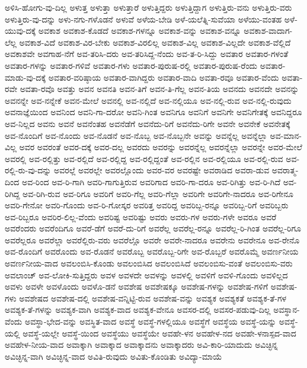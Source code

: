 {ಅಳಿಸಿ-ಹೋಗು-ವು-ದಿಲ್ಲ
ಅಳುತ್ತ
ಅಳುತ್ತಾ
ಅಳುತ್ತಾರೆ
ಅಳುತ್ತಿದ್ದರು
ಅಳುತ್ತಿದ್ದಾಗ
ಅಳುತ್ತಿರು-ವನು
ಅಳುತ್ತಿರು-ವರು
ಅಳುತ್ತಿರು-ವು-ದನ್ನು
ಅಳು-ನಗು-ಗಳೊಡನೆ
ಅಳುವೆ
ಅಳೆಯ-ಬೇಡಿ
ಅಳೆ-ಯಲೆತ್ನಿ-ಸುವೆಯಾ
ಅಳೆಯು-ವಂತಹ
ಅಳೆ-ಯುವು-ದಕ್ಕೆ
ಅವಕಾಶ
ಅವಕಾಶ-ಕೊಡದೆ
ಅವಕಾಶ-ಗಳನ್ನೂ
ಅವಕಾಶ-ವನ್ನು
ಅವಕಾಶ-ವನ್ನೂ
ಅವಕಾಶ-ವಾದಾಗ-ಲೆಲ್ಲ
ಅವಕಾಶ-ವಿದೆ
ಅವಕಾಶ-ವಿರ-ಬೇಕು
ಅವಕಾಶ-ವಿರಲಿಲ್ಲ
ಅವಕಾಶ-ವಿಲ್ಲ
ಅವಕಾಶ-ವಿಲ್ಲದೇ
ಅವಕಾಶ-ವೆಲ್ಲಿದೆ
ಅವಕಾಶವೇ
ಅವಗಾಹ-ನೆಗೆ
ಅವ-ತರಿಸಿ-ದರು
ಅವ-ತರಿಸಿದ್ದ-ನೆಂದು
ಅವ-ತ-ರಿ-ಸಿದ್ದು
ಅವತಾರ
ಅವತಾರ-ಗಳಂತೆ
ಅವತಾರ-ಗಳನ್ನು
ಅವತಾರ-ಗಳಿವೆ
ಅವತಾರ-ಗಳು
ಅವತಾರ-ಪುರುಷ-ರಲ್ಲಿ
ಅವತಾರ-ಪುರುಷ-ರೆಂದು
ಅವತಾರ-ಮಾಡು-ವು-ದಕ್ಕೆ
ಅವತಾರ-ವರಿಷ್ಠಾಯ
ಅವತಾರ-ವಾಗಿದ್ದರು
ಅವತಾರ-ವಾದಿ
ಅವತಾ-ರವೂ
ಅವತಾರ-ವೆಂದು
ಅವತಾ-ರವೇ
ಅವತಾ-ರವೊ
ಅವತ್ತು
ಅವನ
ಅವನತಿ
ಅವನ-ತಿಗೆ
ಅವನ-ತಿ-ಗೆಲ್ಲ
ಅವನ-ತಿಯ
ಅವನದು
ಅವನದೇ
ಅವನನ್ನು
ಅವನನ್ನೇ
ಅವ-ನನ್ನೇಕೆ
ಅವನ-ಮೇಲೆ
ಅವನಲ್ಲಿ
ಅವ-ನಲ್ಲಿದೆ
ಅವ-ನಲ್ಲಿಯೂ
ಅವ-ನಲ್ಲಿ-ರುವ
ಅವ-ನಲ್ಲಿ-ರುವುದು
ಅವನಾಜ್ಞೆಯಿಂದ
ಅವನಿಂದ
ಅವನಿ-ಗಾ-ದರೋ
ಅವನಿ-ಗಿಂತ
ಅವನಿಗೂ
ಅವನಿಗೆ
ಅವನಿಗೇ
ಅವನಿಗೇತಕ್ಕೆ
ಅವನಿದ್ದರೂ
ಅವ-ನಿಲ್ಲದ
ಅವನು
ಅವನೆ
ಅವನೆಂತಹ
ಅವನೆಡೆಗೆ
ಅವನೆದು-ರಿಗೆ
ಅವನೆದು-ರಿಗೇ
ಅವನೇ
ಅವನೇಕೆ
ಅವನೇತಕ್ಕೆ
ಅವ-ನೊಂದಿಗೆ
ಅವ-ನೊಂದು
ಅವ-ನೊಡನೆ
ಅವ-ನೊಬ್ಬ
ಅವ-ನೊಬ್ಬನೇ
ಅವನ್ನು
ಅವನ್ನೆಲ್ಲ
ಅವನ್ನೆಲ್ಲಾ
ಅವ-ಮಾನ-ವಿಲ್ಲ
ಅವರ
ಅವರಂತೆ
ಅವರ-ದಕ್ಕೆ
ಅವರ-ದಲ್ಲ
ಅವರದು
ಅವರನ್ನು
ಅವರನ್ನೆಲ್ಲ
ಅವರನ್ನೆಲ್ಲಾ
ಅವರನ್ನೇ
ಅವರ-ಮೇಲೆ
ಅವರಲ್ಲಿ
ಅವ-ರಲ್ಲಿತ್ತು
ಅವ-ರಲ್ಲಿದೆ
ಅವ-ರಲ್ಲಿದ್ದ
ಅವ-ರಲ್ಲಿದ್ದಂತೆ
ಅವ-ರಲ್ಲಿನ
ಅವ-ರಲ್ಲಿಯೂ
ಅವ-ರಲ್ಲಿ-ರುವ
ಅವ-ರಲ್ಲಿ-ರು-ವು-ದನ್ನು
ಅವರಲ್ಲೆ
ಅವರಲ್ಲೇ
ಅವರಲ್ಲೊಂದು
ಅವರ-ವರ
ಅವರಷ್ಟೇ
ಅವರಾಡಿದ
ಅವರಾ-ಡುವ
ಅವರಾತ್ಮ-ದಿಂದ
ಅವ-ರಿಂದ
ಅವ-ರಿ-ಗಾಗಿ
ಅವರಿ-ಗಾಗುತ್ತಿರುವ
ಅವರಿಗಾದ
ಅವರಿ-ಗಾ-ದರೂ
ಅವ-ರಿಗಿತ್ತು
ಅವ-ರಿ-ಗಿದೆ
ಅವ-ರಿಗಿದ್ದ
ಅವ-ರಿಗಿ-ರುವ
ಅವ-ರಿಗೂ
ಅವರಿಗೆ
ಅವರಿ-ಗೆಲ್ಲ
ಅವರಿ-ಗೆಲ್ಲಾ
ಅವರಿಗೇ
ಅವರಿಗೇ-ನಾದರೂ
ಅವ-ರಿಗೇನೂ
ಅವರಿ-ಗೇನೋ
ಅವರಿ-ಗೊಂದು
ಅವ-ರಿ-ಗೋಸ್ಕರ
ಅವರಿತ್ತ
ಅವರಿದ್ದ
ಅವರಿಬ್ಬ-ರನ್ನೂ
ಅವರಿಬ್ಬ-ರಿಗೆ
ಅವರಿಬ್ಬರು
ಅವ-ರಿಬ್ಬರೂ
ಅವರಿರ-ಲಿಲ್ಲ-ವೆಂದು
ಅವರಿಷ್ಟ
ಅವರಿಷ್ಟು
ಅವರು
ಅವರು-ಗಳ
ಅವರು-ಗಳೇ
ಅವರೂ
ಅವರೆ
ಅವರೆಂದರು
ಅವರೆಂದಿಗೂ
ಅವರೆ-ಡೆಗೆ
ಅವರೆ-ದು-ರಿಗೆ
ಅವರೆಲ್ಲ
ಅವರೆಲ್ಲ-ರನ್ನೂ
ಅವರೆಲ್ಲ-ರಿ-ಗಿಂತ
ಅವರೆಲ್ಲ-ರಿಗೂ
ಅವರೆಲ್ಲರೂ
ಅವರೆಲ್ಲಾ
ಅವರೆಲ್ಲಿರು-ವರು
ಅವರೆಲ್ಲೊ
ಅವರೇ
ಅವರೇ-ನಾದರೂ
ಅವರೇನು
ಅವರೇನೂ
ಅವ-ರೇನೊ
ಅವ-ರೊಂದಿಗೆ
ಅವರೊಂದು
ಅವ-ರೊಡನೆ
ಅವರೊಬ್ಬ
ಅವರೊಬ್ಬ-ರಿಗೇ
ಅವ-ರೊಬ್ಬರೆ
ಅವರೊಮ್ಮೆ
ಅವರ್ಣನೀಯ
ಅವರ್ಣನೀಯ-ವಾದ
ಅವಲಂಬಿಸಿ-ಕೊಂಡು
ಅವಲಂಬಿಸಿದ
ಅವಲಂಬಿಸಿದೆ
ಅವಲಂಬಿಸು-ವಂತೆ
ಅವಲಂಬಿಸು-ವರು
ಅವಲಾಂಚ್
ಅವ-ಲೋಕಿ-ಸುತ್ತಿದ್ದರು
ಅವಳ
ಅವಳದೇ
ಅವಳನ್ನು
ಅವಳಲ್ಲಿ
ಅವಳಿಗೆ
ಅವಳಿ-ಗೊಂದು
ಅವಳಿಲ್ಲದ
ಅವಳು
ಅವಳೇ
ಅವಳೊಂದು
ಅವಳೊ-ಡನೆ
ಅವಶೇಷ
ಅವಶೇಷಕ್ಕೂ
ಅವಶೇಷ-ಗಳನ್ನು
ಅವಶೇಷ-ಗಳಿಗೆ
ಅವಶೇಷ-ಗಳು
ಅವಶೇಷದ
ಅವಶೇಷ-ದಲ್ಲಿ
ಅವಶೇಷ-ವನ್ನಿಟ್ಟಿ-ರುವ
ಅವಶೇಷ-ವನ್ನು
ಅವಶ್ಯಕ
ಅವಶ್ಯಕತೆ
ಅವಶ್ಯಕ-ತೆ-ಗಳ
ಅವಶ್ಯಕ-ತೆ-ಗಳನ್ನು
ಅವಶ್ಯಕ-ವಾಗಿ
ಅವಶ್ಯಕ-ವಾದ
ಅವಶ್ಯಕ-ವೇನೂ
ಅವಸರ-ದಲ್ಲಿ
ಅವಸರ-ಪಡುವು-ದಿಲ್ಲ
ಅವಸ್ಥಾನ-ವೆಂದು
ಅವಸ್ಥಾ-ಭೇದ-ವನ್ನು
ಅವಸ್ಥಿತ-ವಾದ
ಅವಸ್ಥೆ
ಅವಸ್ಥೆ-ಗಳಲ್ಲಿಯೂ
ಅವಸ್ಥೆಗೆ
ಅವಸ್ಥೆಯ
ಅವಸ್ಥೆ-ಯನ್ನು
ಅವಸ್ಥೆ-ಯಲ್ಲಿ
ಅವಸ್ಥೆ-ಯಲ್ಲೇ
ಅವಸ್ಥೆ-ಯಿಂದ
ಅವಸ್ಥೆಯು
ಅವಸ್ಥೆಯೇ
ಅವಹೇ-ಳನ
ಅವಹೇಳ-ನದ
ಅವಹೇ-ಳನಾಸ್ಪದ-ವಾದ
ಅವಹೇಳ-ನೀಯ-ವಾದ
ಅವಾಕ್ಕಾಗಿ
ಅವಾಕ್ಕಾದ
ಅವಾಕ್ಕಾದನು
ಅವಾಕ್ಕಾದರು
ಅವಿ-ಕಾರಿ-ಯಾದುದು
ಅವಿಚ್ಛಿನ್ನ
ಅವಿಚ್ಛಿನ್ನ-ವಾಗಿ
ಅವಿಚ್ಛಿನ್ನ-ವಾದ
ಅವಿತಿ-ರುವುದು
ಅವಿತು-ಕೊಂಡಿತು
ಅವಿದ್ಯಾ-ಮಾಯೆ
}
